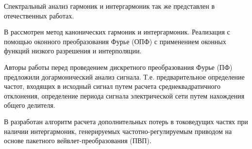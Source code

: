Спектральный анализ гармоник и интергармоник так же представлен в отечественных работах. \cite{Improving_methods_Shizma_2014,Harmonic_analysis_Goldstein2009, Development_method_Osipov_2017}



В \cite{Improving_methods_Shizma_2014} рассмотрен метод канонических гармоник и интергармоник. Реализация с помощью оконного преобразования Фурье (ОПФ) с применением оконных функций низкого разрешения и интерполяции. 


Авторы \cite{Harmonic_analysis_Goldstein2009} работы перед проведением дискретного преобразования Фурье (ПФ) предложили догармонический анализ сигнала. Т.е. предварительное определение частот, входящих в исходный сигнал путем расчета среднеквадратичного отклонения, определение периода сигнала электрической сети путем нахождения общего делителя. 


В \cite{Development_method_Osipov_2017} разработан алгоритм расчета дополнительных потерь в токоведущих частях при наличии интергармоник, генерируемых частотно-регулируемым приводом на основе пакетного вейвлет-преобразования (ПВП).

